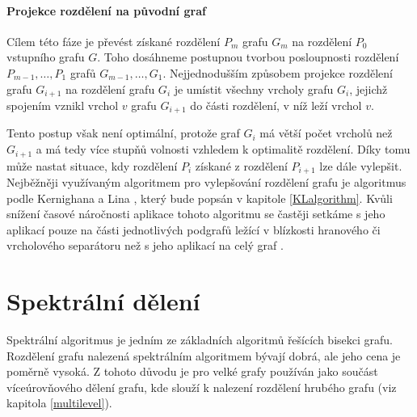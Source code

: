 \documentclass{ctuthesis}
\theoremstyle{plain}
\theoremstyle{definition}
\begin{document}
\paragraph{Projekce rozdělení na původní graf}
Cílem této fáze je převést získané rozdělení $P_m$ grafu $G_m$ na rozdělení $P_0$ vstupního grafu $G$. Toho dosáhneme postupnou tvorbou posloupnosti rozdělení $P_{m-1}, \ldots, P_1$ grafů $G_{m-1}, \ldots, G_1$. Nejjednodušším způsobem projekce rozdělení grafu $G_{i+1}$ na rozdělení grafu $G_i$ je umístit všechny vrcholy grafu $G_i$, jejichž spojením vznikl vrchol $v$ grafu $G_{i+1}$ do části rozdělení, v níž leží vrchol $v$.

Tento postup však není optimální, protože graf $G_i$ má větší počet vrcholů než $G_{i+1}$ a má tedy více stupňů volnosti vzhledem k optimalitě rozdělení. Díky tomu může nastat situace, kdy rozdělení $P_i$ získané z rozdělení $P_{i+1}$ lze dále vylepšit. Nejběžněji využívaným algoritmem pro vylepšování rozdělení grafu je algoritmus podle Kernighana a Lina \cite{keli:70}, který bude popsán v kapitole \ref{KLalgorithm}. Kvůli snížení časové náročnosti aplikace tohoto algoritmu se častěji setkáme s jeho aplikací pouze na části jednotlivých podgrafů ležící v blízkosti hranového či vrcholového separátoru než s jeho aplikací na celý graf \cite{kaku:98}.

\section{Spektrální dělení}
\label{spektral}

Spektrální algoritmus je jedním ze základních algoritmů řešících bisekci grafu. Rozdělení grafu nalezená spektrálním algoritmem bývají dobrá, ale jeho cena je poměrně vysoká. Z tohoto důvodu je pro velké grafy používán jako součást víceúrovňového dělení grafu, kde slouží k nalezení rozdělení hrubého grafu (viz kapitola \ref{multilevel}).
\end{document}
